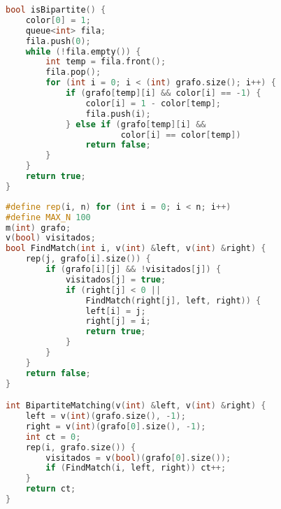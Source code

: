 \begin{lstlisting}[language=C++, title=Checa se é bipartido]
bool isBipartite() {
    color[0] = 1;
    queue<int> fila;
    fila.push(0);
    while (!fila.empty()) {
        int temp = fila.front();
        fila.pop();
        for (int i = 0; i < (int) grafo.size(); i++) {
            if (grafo[temp][i] && color[i] == -1) {
                color[i] = 1 - color[temp];
                fila.push(i);
            } else if (grafo[temp][i] && 
                       color[i] == color[temp])
                return false;
        }
    }
    return true;
}
\end{lstlisting}

\newpage

\begin{lstlisting}[language=C++, title=Emparelhamento Máximo em Grafo Bipartido]
#define rep(i, n) for (int i = 0; i < n; i++)
#define MAX_N 100
m(int) grafo;
v(bool) visitados;
bool FindMatch(int i, v(int) &left, v(int) &right) {
    rep(j, grafo[i].size()) {
        if (grafo[i][j] && !visitados[j]) {
            visitados[j] = true;
            if (right[j] < 0 || 
                FindMatch(right[j], left, right)) {
                left[i] = j;
                right[j] = i;
                return true;
            }
        }
    }
    return false;
}

int BipartiteMatching(v(int) &left, v(int) &right) {
    left = v(int)(grafo.size(), -1);
    right = v(int)(grafo[0].size(), -1);
    int ct = 0;
    rep(i, grafo.size()) {
        visitados = v(bool)(grafo[0].size());
        if (FindMatch(i, left, right)) ct++;
    }
    return ct;
}
\end{lstlisting}
